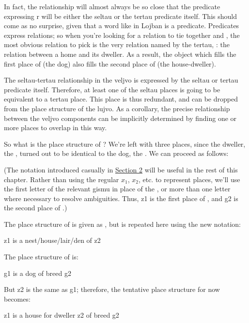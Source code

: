 In fact, the relationship will almost always be so close
    that the predicate expressing r will be either the seltau or
    the tertau predicate itself. This should come as no surprise,
    given that a word like  in Lojban is a predicate.
    Predicates express relations; so when you're looking for a
    relation to tie together  and , the
    most obvious relation to pick is the very relation named by the
    tertau, : the relation between a home and its dweller.
    As a result, the object which fills the first place of
     (the dog) also fills the second place of 
    (the house-dweller).

The seltau-tertau relationship in the veljvo is expressed by
    the seltau or tertau predicate itself. Therefore, at least one
    of the seltau places is going to be equivalent to a tertau
    place. This place is thus redundant, and can be dropped from
    the place structure of the lujvo. As a corollary, the precise
    relationship between the veljvo components can be implicitly
    determined by finding one or more places to overlap in this
    way.

So what is the place structure of ? We're left
    with three places, since the dweller, the , turned
    out to be identical to the dog, the . We can proceed
    as follows:

(The notation introduced casually in \hyperref[sec:12:2]{Section
    2} will be useful in the rest of this chapter. Rather than
    using the regular $x_1$, $x_2$, etc. to represent places, we'll use
    the first letter of the relevant gismu in place of the ,
    or more than one letter where necessary to resolve ambiguities.
    Thus, z1 is the first place of , and g2 is the second
    place of .)

The place structure of  is given as , but is repeated here using the
    new notation:
\begin{example}
z1 is a nest/house/lair/den of z2
\end{example}

The place structure of  is:
\begin{example}
g1 is a dog of breed g2
\end{example}

But z2 is the same as g1; therefore, the tentative place
    structure for  now becomes:
\begin{example}
z1 is a house for dweller z2 of breed g2
\end{example}

